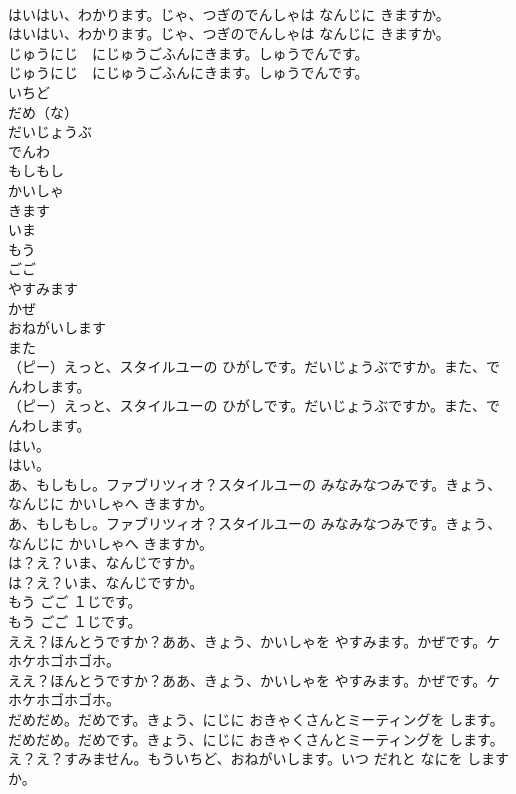 \documentclass[8pt]{extreport}
\begin{document}
\begin{CJK}{UTF8}{min}
\\	はいはい、わかります。じゃ、つぎのでんしゃは なんじに きますか。	
\\	はいはい、わかります。じゃ、つぎのでんしゃは なんじに きますか。 
\\	じゅうにじ　にじゅうごふんにきます。しゅうでんです。	
\\	じゅうにじ　にじゅうごふんにきます。しゅうでんです。 
\\	いちど
\\	だめ（な）
\\	だいじょうぶ
\\	でんわ
\\	もしもし
\\	かいしゃ
\\	きます
\\	いま
\\	もう
\\	ごご
\\	やすみます
\\	かぜ
\\	おねがいします
\\	また
\\	（ピー）えっと、スタイルユーの ひがしです。だいじょうぶですか。また、でんわします。	
\\	（ピー）えっと、スタイルユーの ひがしです。だいじょうぶですか。また、でんわします。 
\\	はい。	
\\	はい。 
\\	あ、もしもし。ファブリツィオ？スタイルユーの みなみなつみです。きょう、なんじに かいしゃへ きますか。	
\\	あ、もしもし。ファブリツィオ？スタイルユーの みなみなつみです。きょう、なんじに かいしゃへ きますか。 
\\	は？え？いま、なんじですか。	
\\	は？え？いま、なんじですか。 
\\	もう ごご １じです。	
\\	もう ごご １じです。 
\\	ええ？ほんとうですか？ああ、きょう、かいしゃを やすみます。かぜです。ケホケホゴホゴホ。	
\\	ええ？ほんとうですか？ああ、きょう、かいしゃを やすみます。かぜです。ケホケホゴホゴホ。 
\\	だめだめ。だめです。きょう、にじに おきゃくさんとミーティングを します。	
\\	だめだめ。だめです。きょう、にじに おきゃくさんとミーティングを します。 
\\	え？え？すみません。もういちど、おねがいします。いつ だれと なにを しますか。	

\end{CJK}
\end{document}
